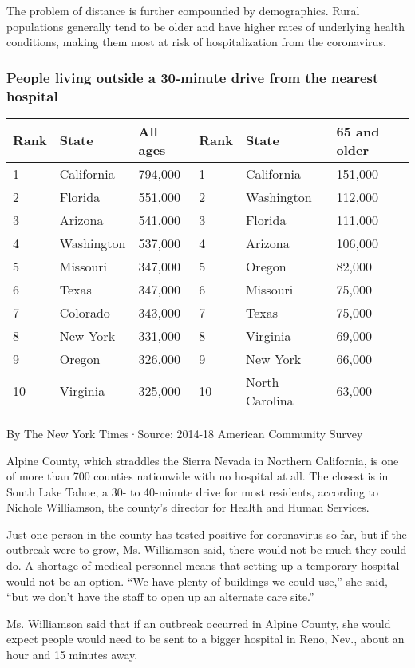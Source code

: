 The problem of distance is further compounded by demographics. Rural
populations generally tend to be older and have higher rates of
underlying health conditions, making them most at risk of
hospitalization from the coronavirus.

\hypertarget{people-living-outside-a-30-minute-drive-from-the-nearest-hospital}{%
\subsubsection{People living outside a 30-minute drive from the nearest
hospital}\label{people-living-outside-a-30-minute-drive-from-the-nearest-hospital}}

\begin{longtable}[]{@{}llllll@{}}
\toprule
\textbf{Rank} & \textbf{State} & \textbf{All ages} & \textbf{Rank} &
\textbf{State} & \textbf{65 and older}\tabularnewline
\midrule
\endhead
1 & California & 794,000 & 1 & California & 151,000\tabularnewline
2 & Florida & 551,000 & 2 & Washington & 112,000\tabularnewline
3 & Arizona & 541,000 & 3 & Florida & 111,000\tabularnewline
4 & Washington & 537,000 & 4 & Arizona & 106,000\tabularnewline
5 & Missouri & 347,000 & 5 & Oregon & 82,000\tabularnewline
6 & Texas & 347,000 & 6 & Missouri & 75,000\tabularnewline
7 & Colorado & 343,000 & 7 & Texas & 75,000\tabularnewline
8 & New York & 331,000 & 8 & Virginia & 69,000\tabularnewline
9 & Oregon & 326,000 & 9 & New York & 66,000\tabularnewline
10 & Virginia & 325,000 & 10 & North Carolina & 63,000\tabularnewline
\bottomrule
\end{longtable}

By The New York Times·Source: 2014-18 American Community Survey

Alpine County, which straddles the Sierra Nevada in Northern California,
is one of more than 700 counties nationwide with no hospital at all. The
closest is in South Lake Tahoe, a 30- to 40-minute drive for most
residents, according to Nichole Williamson, the county's director for
Health and Human Services.

Just one person in the county has tested positive for coronavirus so
far, but if the outbreak were to grow, Ms. Williamson said, there would
not be much they could do. A shortage of medical personnel means that
setting up a temporary hospital would not be an option. ``We have plenty
of buildings we could use,'' she said, ``but we don't have the staff to
open up an alternate care site.''

Ms. Williamson said that if an outbreak occurred in Alpine County, she
would expect people would need to be sent to a bigger hospital in Reno,
Nev., about an hour and 15 minutes away.

